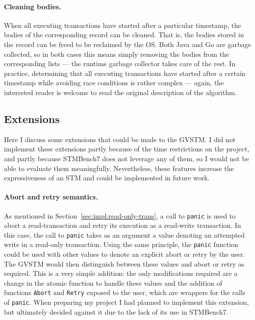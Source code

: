 \documentclass[12pt,a4paper,oneside,openright]{report}
\newcommand{\goFunc}[1]{\texttt{#1}}
\begin{document}
\paragraph{Cleaning bodies.} When all executing transactions have
started after a particular timestamp, the bodies of the corresponding
record can be cleaned. That is, the bodies stored in the record can be
freed to be reclaimed by the OS. Both Java and Go are garbage
collected, so in both cases this means simply removing the bodies from
the corresponding lists --- the runtime garbage collector takes care
of the rest. In practice, determining that all executing transactions
have started after a certain timestamp while avoiding race conditions
is rather complex --- again, the interested reader is welcome to read
the original description of the algorithm.

\subsection{Extensions}
\label{sec:impl:extensions}

Here I discuss some extensions that could be made to the GVSTM. I did
not implement these extensions partly because of the time restrictions
on the project, and partly because STMBench7 does not leverage any of
them, so I would not be able to evaluate them
meaningfully. Nevertheless, these features increase the expressiveness
of an STM and could be implemented in future work.

\paragraph{Abort and retry semantics.} As mentioned in
Section~\ref{sec:impl:read-only-trans}, a call to \goFunc{panic} is
used to abort a read-transaction and retry its execution as a
read-write transaction. In this case, the call to \goFunc{panic} takes
as an argument a value denoting an attempted write in a read-only
transaction. Using the same principle, the \goFunc{panic} function
could be used with other values to denote an explicit abort or retry
by the user. The GVSTM would then distinguish between these values and
abort or retry as required. This is a very simple addition: the only
modifications required are a change in the atomic function to handle
these values and the addition of functions \goFunc{Abort} and
\goFunc{Retry} exposed to the user, which are wrappers for the calls
of \goFunc{panic}. When preparing my project I had planned to
implement this extension, but ultimately decided against it due to the
lack of its use in STMBench7.
\end{document}
